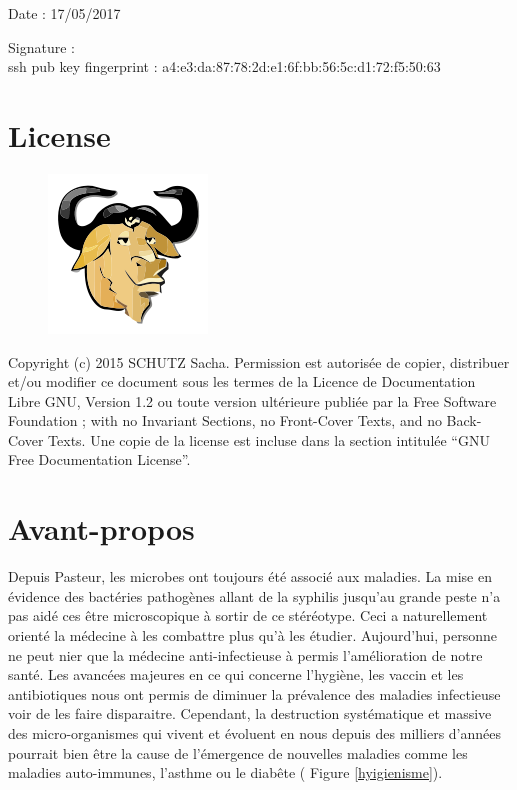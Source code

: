 \documentclass[12pt,a4paper]{article}
\begin{document}
Date : 17/05/2017

\vspace{0.5cm}

Signature : \\

ssh pub key fingerprint : a4:e3:da:87:78:2d:e1:6f:bb:56:5c:d1:72:f5:50:63
\vfill 

\section*{License}

\begin{figure}
\includegraphics[scale=0.5]{img/gfdl.png}\hfill
\end{figure}

Copyright (c) 2015 SCHUTZ Sacha. Permission est autorisée de copier,
distribuer et/ou modifier ce document sous les termes de la Licence de
Documentation Libre GNU, Version 1.2 ou toute version ultérieure publiée
par la Free Software Foundation ; with no Invariant Sections, no
Front-Cover Texts, and no Back-Cover Texts. Une copie de la license est
incluse dans la section intitulée ``GNU Free Documentation License''.

\thispagestyle{empty} 
\setcounter{page}{0}
\thispagestyle{empty} 

\newpage

\tableofcontents
\newpage


\section{Avant-propos}

Depuis Pasteur, les microbes ont toujours été associé aux maladies. La mise en évidence des bactéries pathogènes allant de la syphilis jusqu'au grande peste n'a pas aidé ces être microscopique à sortir de ce stéréotype. Ceci a naturellement orienté la médecine à les combattre plus qu'à les étudier.
Aujourd'hui, personne ne peut nier que la médecine anti-infectieuse à permis l'amélioration de notre santé. 
Les avancées majeures en ce qui concerne l'hygiène, les vaccin et les antibiotiques nous ont permis de diminuer la prévalence des maladies infectieuse voir de les faire disparaitre. Cependant, la destruction systématique et massive des micro-organismes qui vivent et évoluent en nous depuis des milliers d'années pourrait bien être la cause de l'émergence de nouvelles maladies comme les maladies auto-immunes, l'asthme ou le diabête ( Figure \ref{hyigienisme}).
\end{document}
